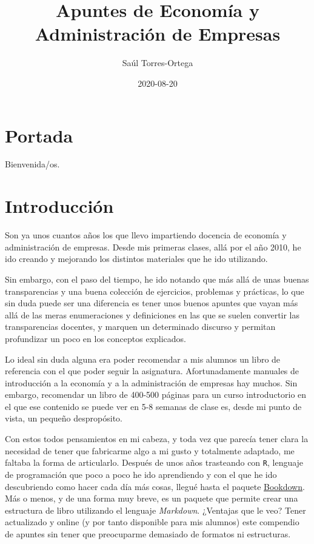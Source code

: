 \documentclass[
]{krantz}
\title{Apuntes de Economía y Administración de Empresas}
\author{Saúl Torres-Ortega}
\date{2020-08-20}
\begin{document}
\maketitle

{
\setcounter{tocdepth}{2}
\tableofcontents
}
\hypertarget{portada}{%
\chapter*{Portada}\label{portada}}


Bienvenida/os.

\hypertarget{introducciuxf3n}{%
\chapter*{Introducción}\label{introducciuxf3n}}


Son ya unos cuantos años los que llevo impartiendo docencia de economía y administración de empresas. Desde mis primeras clases, allá por el año 2010, he ido creando y mejorando los distintos materiales que he ido utilizando.

Sin embargo, con el paso del tiempo, he ido notando que más allá de unas buenas transparencias y una buena colección de ejercicios, problemas y prácticas, lo que sin duda puede ser una diferencia es tener unos buenos apuntes que vayan más allá de las meras enumeraciones y definiciones en las que se suelen convertir las transparencias docentes, y marquen un determinado discurso y permitan profundizar un poco en los conceptos explicados.

Lo ideal sin duda alguna era poder recomendar a mis alumnos un libro de referencia con el que poder seguir la asignatura. Afortunadamente manuales de introducción a la economía y a la administración de empresas hay muchos. Sin embargo, recomendar un libro de 400-500 páginas para un curso introductorio en el que ese contenido se puede ver en 5-8 semanas de clase es, desde mi punto de vista, un pequeño despropósito.

Con estos todos pensamientos en mi cabeza, y toda vez que parecía tener clara la necesidad de tener que fabricarme algo a mi gusto y totalmente adaptado, me faltaba la forma de articularlo. Después de unos años trasteando con \texttt{R}, lenguaje de programación que poco a poco he ido aprendiendo y con el que he ido descubriendo como hacer cada día más cosas, llegué hasta el paquete \href{https://bookdown.org/}{Bookdown}. Más o menos, y de una forma muy breve, es un paquete que permite crear una estructura de libro utilizando el lenguaje \emph{Markdown}. ¿Ventajas que le veo? Tener actualizado y online (y por tanto disponible para mis alumnos) este compendio de apuntes sin tener que preocuparme demasiado de formatos ni estructuras.
\end{document}
